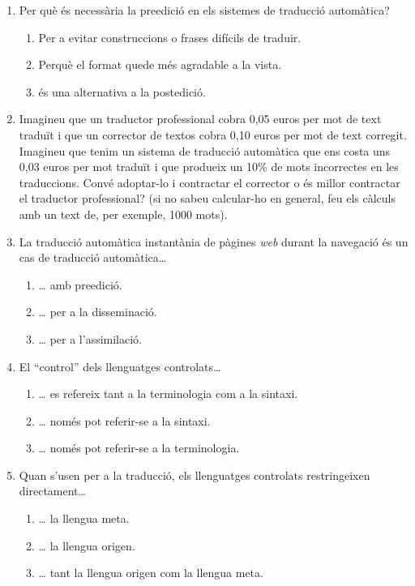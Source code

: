 \begin{enumerate}
\item Per què és necessària la preedició en els sistemes
 de traducció automàtica?
 \begin{enumerate}
 \item Per a evitar construccions o frases difícils de traduir.
 \item Perquè el format quede més agradable a la vista.
 \item és una alternativa a la postedició.
 \end{enumerate}

\item Imagineu que un traductor professional cobra 0,05 euros per mot
  de text traduït i que un corrector de textos cobra 0,10 euros per
  mot de text corregit. Imagineu que tenim un sistema de traducció
  automàtica que ens costa uns 0,03 euros per mot traduït i que
  produeix un 10\% de mots incorrectes en les traduccions. Convé
  adoptar-lo i contractar el corrector o és millor contractar el
  traductor professional? (si no sabeu calcular-ho en general, feu els
  càlculs amb un text de, per exemple, 1000 mots).

\item 
   La traducció automàtica instantània de pàgines \emph{web} durant
   la navegació és un cas de traducció automàtica{\ldots}
   
\begin{enumerate}
\item {\ldots} amb preedició.
\item {\ldots} per a la disseminació.
\item {\ldots} per a l'assimilació.
\end{enumerate}

\item 
 El ``control'' dels llenguatges controlats{\ldots}

\begin{enumerate}
\item {\ldots} es refereix tant a la terminologia com a la sintaxi.
\item {\ldots} només pot referir-se a la sintaxi.
\item {\ldots} només pot referir-se a la terminologia.
\end{enumerate}
\item Quan s'usen per a la traducció, 
els llenguatges controlats restringeixen directament{\ldots}
\begin{enumerate}
\item {\ldots} la llengua meta.
\item {\ldots} la llengua origen.
\item {\ldots} tant la llengua origen com la llengua meta.
\end{enumerate}


\end{enumerate}
